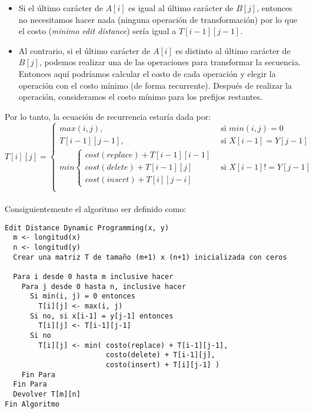 \begin{itemize}
    \item Si el último carácter de \(A[i]\) es igual al último carácter de \(B[j]\), entonces no necesitamos hacer nada (ninguna operación de transformación) por lo que el costo (\textit{minimo edit distance}) sería igual a \(T[i-1][j-1]\).
    \item Al contrario, si el último carácter de \(A[i]\) es distinto al último carácter de \(B[j]\), podemos realizar una de las operaciones para transformar la secuencia. Entonces aquí podríamos calcular el costo de cada operación y elegir la operación con el costo mínimo (de forma recurrente). Después de realizar la operación, consideramos el costo mínimo para los prefijos restantes.
\end{itemize}

Por lo tanto, la ecuación de recurrencia estaría dada por:\\

\[
T[i][j] = 
\begin{cases}
max(i,j), & \text{si } min(i,j) = 0 \\
T[i-1][j-1], & \text{si } X[i-1] = Y[j-1]\\
min\begin{cases}
cost(replace) + T[i-1][i-1]\\
cost(delete) + T[i-1][j]\\
cost(insert) + T[i][j-i] 
\end{cases}& \text{si } X[i-1] != Y[j-1]\\
\end{cases}
\]\\

Consiguientemente el algoritmo ser definido como:\\

\begin{verbatim}
Edit Distance Dynamic Programming(x, y)
  m <- longitud(x)
  n <- longitud(y)
  Crear una matriz T de tamaño (m+1) x (n+1) inicializada con ceros
  
  Para i desde 0 hasta m inclusive hacer
    Para j desde 0 hasta n, inclusive hacer
      Si min(i, j) = 0 entonces
        T[i][j] <- max(i, j)
      Si no, si x[i-1] = y[j-1] entonces
        T[i][j] <- T[i-1][j-1]
      Si no
        T[i][j] <- min( costo(replace) + T[i-1][j-1],
                        costo(delete) + T[i-1][j],
                        costo(insert) + T[i][j-1] )
    Fin Para
  Fin Para
  Devolver T[m][n]
Fin Algoritmo
\end{verbatim}